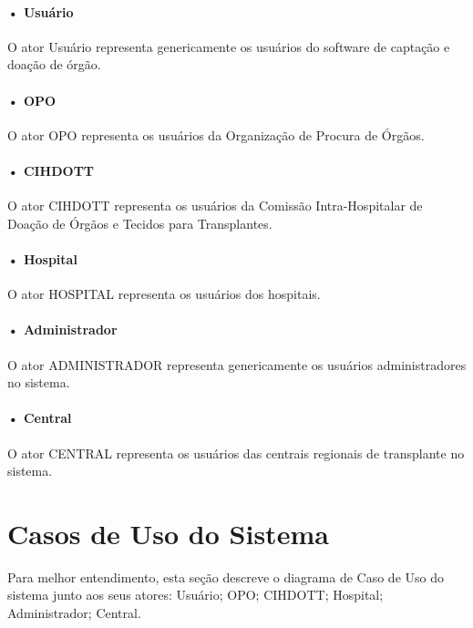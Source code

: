\documentclass[portuguese,oneside]{tcc}
\begin{document}
\paragraph*{• Usuário}
O ator Usuário representa genericamente os usuários do software de captação e doação de órgão.

\paragraph*{• OPO}
O ator OPO representa os usuários da Organização de Procura de Órgãos.

\paragraph*{• CIHDOTT}
O ator CIHDOTT representa os usuários da Comissão Intra-Hospitalar de Doação de Órgãos e Tecidos para Transplantes.

\paragraph*{• Hospital}
O ator HOSPITAL representa os usuários dos hospitais.

\paragraph*{• Administrador}
O ator ADMINISTRADOR representa genericamente os usuários administradores no sistema.

\paragraph*{• Central}
O ator CENTRAL representa os usuários das centrais regionais de transplante no sistema.

\section{Casos de Uso do Sistema}
Para melhor entendimento, esta seção descreve o diagrama de Caso de Uso do sistema junto aos seus atores: Usuário; OPO; CIHDOTT; Hospital; Administrador; Central.
\end{document}
